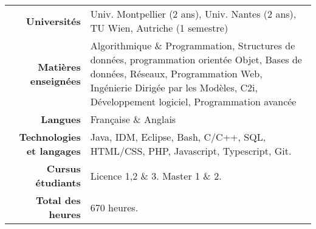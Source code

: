 
\begin{tabular}{r @{~$\rangle$~} p{}}

\textbf{Universités} & Univ. Montpellier (2 ans), Univ. Nantes (2 ans), TU Wien, Autriche (1 semestre) \\

\textbf{Matières enseignées} & Algorithmique \& Programmation, Structures de données, programmation orientée Objet, Bases de données, Réseaux, Programmation Web, Ingénierie Dirigée par les Modèles, C2i, Développement logiciel, Programmation avancée \\

\textbf{Langues} & Française \& Anglais \\

\textbf{Technologies et langages} & Java, IDM, Eclipse, Bash, C/C++, SQL, HTML/CSS, PHP, Javascript, Typescript, Git.\\

\textbf{Cursus étudiants} & Licence 1,2 \& 3. Master 1 \& 2. \\

\textbf{Total des heures} & $670$ heures. \\
\end{tabular}
